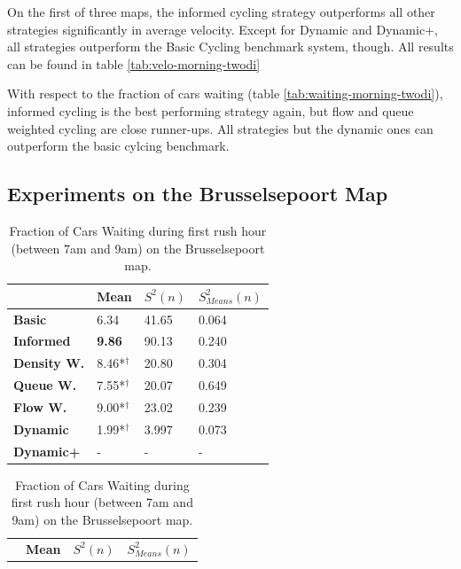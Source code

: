 \documentclass[11pt]{article}
\begin{document}
On the first of three maps, the informed cycling strategy outperforms all other strategies significantly in average velocity. Except for Dynamic and Dynamic+, all strategies outperform the Basic Cycling benchmark system, though. All results can be found in table \ref{tab:velo-morning-twodi}

With respect to the fraction of cars waiting (table \ref{tab:waiting-morning-twodi}), informed cycling is the best performing strategy again, but flow and queue weighted cycling are close runner-ups. All strategies but the dynamic ones can outperform the basic cylcing benchmark.

\subsection{Experiments on the Brusselsepoort Map}
\begin{table}[t]
\centering
\caption{Average Velocity of Cars during first rush hour (between 7am and 9am) on the Brusselsepoort map.}
\label{tab:velo-morning-brussel}
\begin{tabular}{l|l|l|l|}
\textbf{}                 & \textbf{Mean} & \textbf{$S^2(n)$} & \textbf{$S_{Means}^2(n)$} \\
\hline\textbf{Basic}            & 6.34          & 41.65             & 0.064                      \\
\textbf{Informed}         & \textbf{9.86}          & 90.13             & 0.240                      \\
\hline\textbf{Density W.} & 8.46*$^\dagger$          & 20.80             & 0.304                      \\
\textbf{Queue W.}   & 7.55*$^\dagger$          & 20.07             & 0.649                      \\
\textbf{Flow W.}    & 9.00*$^\dagger$          & 23.02             & 0.239                      \\
\textbf{Dynamic}          & 1.99*$^\dagger$          & 3.997             & 0.073                      \\
\textbf{Dynamic+}         & -             & -                 & -                    
\end{tabular}
\vspace{20pt}
\centering
\caption{Fraction of Cars Waiting during first rush hour (between 7am and 9am) on the Brusselsepoort map.}
\label{tab:waiting-morning-brussel}
\begin{tabular}{l|l|l|l|}
\textbf{}                 & \textbf{Mean} & \textbf{$S^2(n)$} & \textbf{$S_{Means}^2(n)$} \\

\end{tabular}
\end{table}
\end{document}

